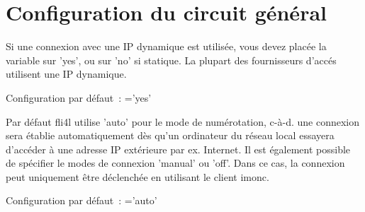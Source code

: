 
  \section{Configuration du circuit général}

  \begin{description}

    {Si une connexion avec une IP dynamique est utilisée, vous
     devez placée la variable  sur 'yes', ou
     sur 'no' si statique. La plupart des fournisseurs d'accés utilisent
     une IP dynamique.

      Configuration par défaut~: ='yes'}


    {Par défaut fli4l utilise 'auto' pour le mode de numérotation,
     c-à-d. une connexion sera établie automatiquement dès qu'un ordinateur
     du réseau local essayera d'accéder à une adresse IP extérieure par ex.
     Internet. Il est également possible de spécifier le modes de connexion
     'manual' ou 'off'. Dans ce cas, la connexion peut uniquement être déclenchée
     en utilisant le client imonc.

      Configuration par défaut~: ='auto'}

  \end{description}
